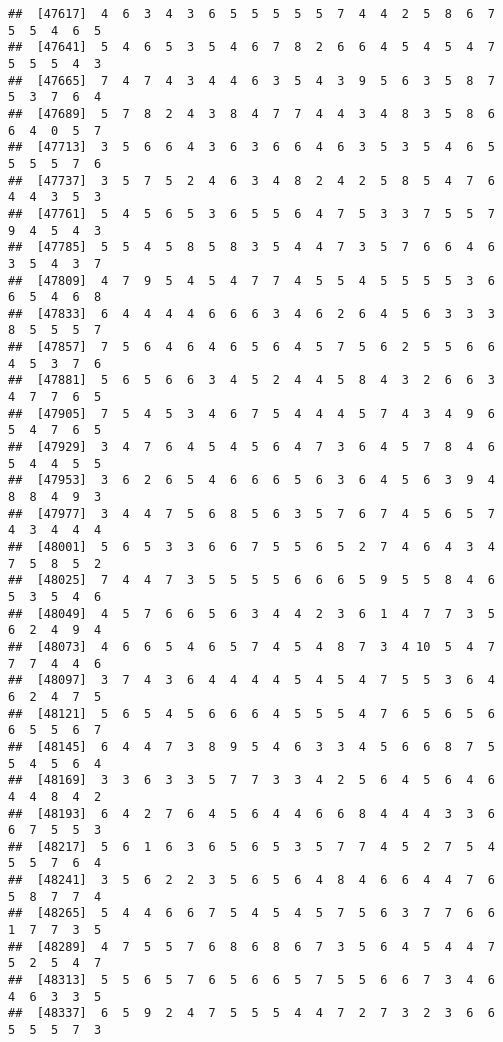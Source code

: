 \documentclass[
]{book}
\begin{document}
\begin{verbatim}
##  [47617]  4  6  3  4  3  6  5  5  5  5  5  7  4  4  2  5  8  6  7  5  5  4  6  5
##  [47641]  5  4  6  5  3  5  4  6  7  8  2  6  6  4  5  4  5  4  7  5  5  5  4  3
##  [47665]  7  4  7  4  3  4  4  6  3  5  4  3  9  5  6  3  5  8  7  5  3  7  6  4
##  [47689]  5  7  8  2  4  3  8  4  7  7  4  4  3  4  8  3  5  8  6  6  4  0  5  7
##  [47713]  3  5  6  6  4  3  6  3  6  6  4  6  3  5  3  5  4  6  5  5  5  5  7  6
##  [47737]  3  5  7  5  2  4  6  3  4  8  2  4  2  5  8  5  4  7  6  4  4  3  5  3
##  [47761]  5  4  5  6  5  3  6  5  5  6  4  7  5  3  3  7  5  5  7  9  4  5  4  3
##  [47785]  5  5  4  5  8  5  8  3  5  4  4  7  3  5  7  6  6  4  6  3  5  4  3  7
##  [47809]  4  7  9  5  4  5  4  7  7  4  5  5  4  5  5  5  5  3  6  6  5  4  6  8
##  [47833]  6  4  4  4  4  6  6  6  3  4  6  2  6  4  5  6  3  3  3  8  5  5  5  7
##  [47857]  7  5  6  4  6  4  6  5  6  4  5  7  5  6  2  5  5  6  6  4  5  3  7  6
##  [47881]  5  6  5  6  6  3  4  5  2  4  4  5  8  4  3  2  6  6  3  4  7  7  6  5
##  [47905]  7  5  4  5  3  4  6  7  5  4  4  4  5  7  4  3  4  9  6  5  4  7  6  5
##  [47929]  3  4  7  6  4  5  4  5  6  4  7  3  6  4  5  7  8  4  6  5  4  4  5  5
##  [47953]  3  6  2  6  5  4  6  6  6  5  6  3  6  4  5  6  3  9  4  8  8  4  9  3
##  [47977]  3  4  4  7  5  6  8  5  6  3  5  7  6  7  4  5  6  5  7  4  3  4  4  4
##  [48001]  5  6  5  3  3  6  6  7  5  5  6  5  2  7  4  6  4  3  4  7  5  8  5  2
##  [48025]  7  4  4  7  3  5  5  5  5  6  6  6  5  9  5  5  8  4  6  5  3  5  4  6
##  [48049]  4  5  7  6  6  5  6  3  4  4  2  3  6  1  4  7  7  3  5  6  2  4  9  4
##  [48073]  4  6  6  5  4  6  5  7  4  5  4  8  7  3  4 10  5  4  7  7  7  4  4  6
##  [48097]  3  7  4  3  6  4  4  4  4  5  4  5  4  7  5  5  3  6  4  6  2  4  7  5
##  [48121]  5  6  5  4  5  6  6  6  4  5  5  5  4  7  6  5  6  5  6  6  5  5  6  7
##  [48145]  6  4  4  7  3  8  9  5  4  6  3  3  4  5  6  6  8  7  5  5  4  5  6  4
##  [48169]  3  3  6  3  3  5  7  7  3  3  4  2  5  6  4  5  6  4  6  4  4  8  4  2
##  [48193]  6  4  2  7  6  4  5  6  4  4  6  6  8  4  4  4  3  3  6  6  7  5  5  3
##  [48217]  5  6  1  6  3  6  5  6  5  3  5  7  7  4  5  2  7  5  4  5  5  7  6  4
##  [48241]  3  5  6  2  2  3  5  6  5  6  4  8  4  6  6  4  4  7  6  5  8  7  7  4
##  [48265]  5  4  4  6  6  7  5  4  5  4  5  7  5  6  3  7  7  6  6  1  7  7  3  5
##  [48289]  4  7  5  5  7  6  8  6  8  6  7  3  5  6  4  5  4  4  7  5  2  5  4  7
##  [48313]  5  5  6  5  7  6  5  6  6  5  7  5  5  6  6  7  3  4  6  4  6  3  3  5
##  [48337]  6  5  9  2  4  7  5  5  5  4  4  7  2  7  3  2  3  6  6  5  5  5  7  3

\end{verbatim}
\end{document}
